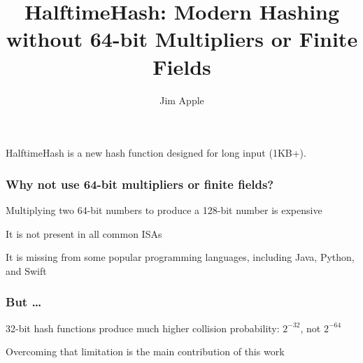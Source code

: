 \documentclass[xcolor=dvipsnames]{beamer}
\begin{document}
\title{HalftimeHash: Modern Hashing without 64-bit Multipliers or Finite Fields}
\author{Jim Apple}
\date{}

\frame{\titlepage}

\begin{frame}
  HalftimeHash is a new hash function designed for long input (1KB+).
\end{frame}



\begin{frame}
  \frametitle{Why not use 64-bit multipliers or finite fields?}
  Multiplying two 64-bit numbers to produce a 128-bit number is expensive %
  \pause

  $ $\\
  It is not present in all common ISAs
  \pause

  $ $\\
  It is missing from some popular programming languages, including Java, Python, and Swift
\end{frame}

\begin{frame}
  \frametitle{But \ldots}
  32-bit hash functions produce much higher collision probability: $2^{-32}$, not $2^{-64}$
\end{frame}

\begin{frame}
  Overcoming that limitation is the main contribution of this work
\end{frame}
\end{document}
